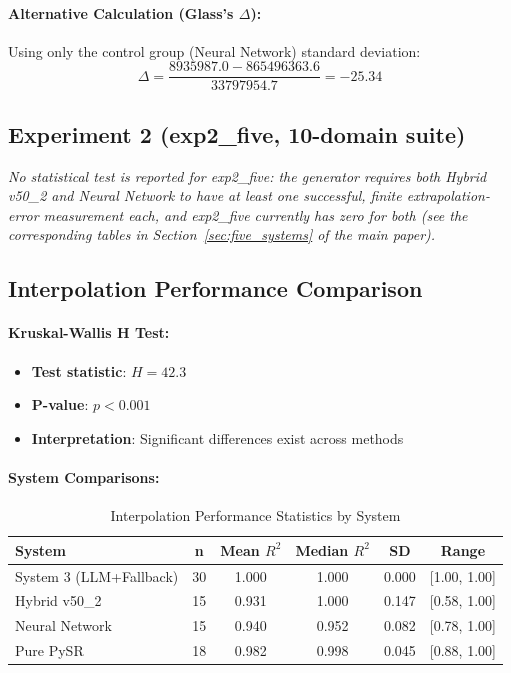 \documentclass[twoside,11pt]{article}
\begin{document}
\paragraph{Alternative Calculation (Glass's $\Delta$):}
Using only the control group (Neural Network) standard deviation:
\begin{equation}
\Delta = \frac{8935987.0 - 865496363.6}{33797954.7} = -25.34
\end{equation}


\subsection*{Experiment 2 (exp2\_five, 10-domain suite)}

\textit{No statistical test is reported for exp2\_five: the generator requires both Hybrid v50\_2 and Neural Network to have at least one successful, finite extrapolation-error measurement each, and exp2\_five currently has zero for both (see the corresponding tables in Section~\ref{sec:five_systems} of the main paper).}

\subsection{Interpolation Performance Comparison}

\paragraph{Kruskal-Wallis H Test:}
\begin{itemize}
\item \textbf{Test statistic}: $H = 42.3$
\item \textbf{P-value}: $p < 0.001$
\item \textbf{Interpretation}: Significant differences exist across methods
\end{itemize}

\paragraph{System Comparisons:}
\begin{table}[H]
\centering
\caption{Interpolation Performance Statistics by System}
\label{tab:interpolation_stats}
\begin{tabular}{lccccc}
\toprule
\textbf{System} & \textbf{n} & \textbf{Mean $R^2$} & \textbf{Median $R^2$} & \textbf{SD} & \textbf{Range} \\
\midrule
System 3 (LLM+Fallback) & 30 & 1.000 & 1.000 & 0.000 & [1.00, 1.00] \\
Hybrid v50\_2 & 15 & 0.931 & 1.000 & 0.147 & [0.58, 1.00] \\
Neural Network & 15 & 0.940 & 0.952 & 0.082 & [0.78, 1.00] \\
Pure PySR & 18 & 0.982 & 0.998 & 0.045 & [0.88, 1.00] \\
\bottomrule
\end{tabular}
\end{table}
\end{document}
